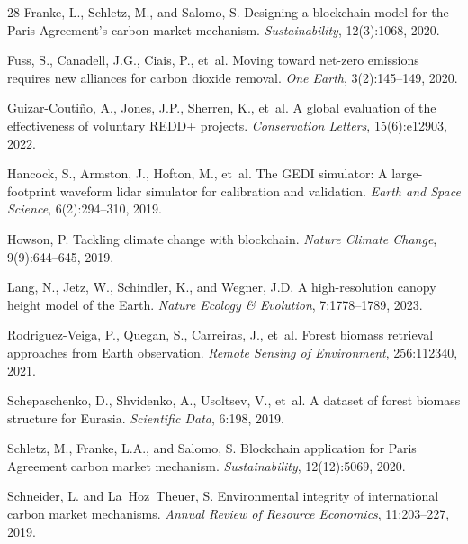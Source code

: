 \documentclass[11pt,a4paper]{article}
\begin{document}
\begin{thebibliography}{28}
Franke, L., Schletz, M., and Salomo, S.
\newblock Designing a blockchain model for the Paris Agreement's carbon market
  mechanism.
\newblock \emph{Sustainability}, 12(3):1068, 2020.

Fuss, S., Canadell, J.G., Ciais, P., et~al.
\newblock Moving toward net-zero emissions requires new alliances for carbon
  dioxide removal.
\newblock \emph{One Earth}, 3(2):145--149, 2020.

Guizar-Couti{\~n}o, A., Jones, J.P., Sherren, K., et~al.
\newblock A global evaluation of the effectiveness of voluntary REDD+ projects.
\newblock \emph{Conservation Letters}, 15(6):e12903, 2022.

Hancock, S., Armston, J., Hofton, M., et~al.
\newblock The GEDI simulator: A large-footprint waveform lidar simulator for
  calibration and validation.
\newblock \emph{Earth and Space Science}, 6(2):294--310, 2019.

Howson, P.
\newblock Tackling climate change with blockchain.
\newblock \emph{Nature Climate Change}, 9(9):644--645, 2019.

Lang, N., Jetz, W., Schindler, K., and Wegner, J.D.
\newblock A high-resolution canopy height model of the Earth.
\newblock \emph{Nature Ecology \& Evolution}, 7:1778--1789, 2023.

Rodriguez-Veiga, P., Quegan, S., Carreiras, J., et~al.
\newblock Forest biomass retrieval approaches from Earth observation.
\newblock \emph{Remote Sensing of Environment}, 256:112340, 2021.

Schepaschenko, D., Shvidenko, A., Usoltsev, V., et~al.
\newblock A dataset of forest biomass structure for Eurasia.
\newblock \emph{Scientific Data}, 6:198, 2019.

Schletz, M., Franke, L.A., and Salomo, S.
\newblock Blockchain application for Paris Agreement carbon market mechanism.
\newblock \emph{Sustainability}, 12(12):5069, 2020.

Schneider, L. and La~Hoz~Theuer, S.
\newblock Environmental integrity of international carbon market mechanisms.
\newblock \emph{Annual Review of Resource Economics}, 11:203--227, 2019.


\end{thebibliography}
\end{document}
